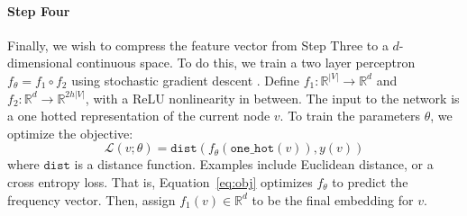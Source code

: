 \paragraph{Step Four} Finally, we wish to compress the feature vector from Step Three to a $d$-dimensional continuous space. To do this, we train a two layer perceptron $f_\theta = f_1 \circ f_2$ using stochastic gradient descent \citep{goodfellow2016deep,kingma2014adam}. Define $f_1: \mathbb{R}^{|V|} \rightarrow \mathbb{R}^d$ and $f_2: \mathbb{R}^d \rightarrow \mathbb{R}^{2h|V|}$, with a ReLU nonlinearity in between. The input to the network is a one hotted representation of the current node $v$.
To train the parameters $\theta$, we optimize the objective:
\begin{equation}
  \mathcal{L}(v; \theta) = \texttt{dist}(f_\theta(\texttt{one\_hot}(v)), y(v))
  \label{eq:obj}
\end{equation}
where $\texttt{dist}$ is a distance function. Examples include Euclidean distance, or a cross entropy loss.
That is, Equation~\ref{eq:obj} optimizes $f_\theta$ to predict the frequency vector. Then, assign $f_1(v) \in \mathbb{R}^d$ to be the final embedding for $v$.\newline

